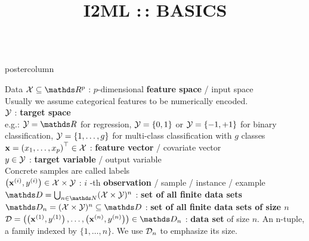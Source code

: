 \documentclass{beamer}
\title{I2ML :\,: BASICS} %
\begin{document}
\begin{frame}[fragile]{}
\vspace{-8ex}
\begin{columns}
	\begin{column}{.31\textwidth}
		\begin{beamercolorbox}[center]{postercolumn}
			\begin{minipage}{.98\textwidth}
				\parbox[t][\columnheight]{\textwidth}{
\begin{myblock}{Data}
 $\Xspace \subseteq \R^p$ : $p$-dimensional \textbf{feature space} / input space\\ 
Usually we assume categorical features to be numerically encoded.\\

$\mathcal{Y}$ : \textbf{target space} \\ 
e.g.: $\Yspace = \R$ for regression, $\mathcal{Y} = \{0, 1\}$ or $\mathcal{Y} = \{-1, +1\}$ for binary classification, $\mathcal{Y} = \{1, \ldots, g\}$ for multi-class classification with $g$ classes\\

$\mathbf{x} = \left(x_1, \ldots, x_p\right)^\top \in \mathcal{X}$ : \textbf{feature vector} / covariate vector\\ 
 
$y \in \mathcal{Y}$ : \textbf{target variable} / output variable \\
Concrete samples are called labels \\

$\left(\mathbf{x}^{(i)}, y^{(i)}\right) \in \mathcal{X}\times \mathcal{Y}$ : $i$ -th \textbf{observation} / sample / instance / example\\

$\allDatasets = \defAllDatasets$ : \textbf{set of all finite data sets} \\

$\allDatasetsn = \defAllDatasetsn \subseteq \allDatasets$ : \textbf{set of all finite data sets of size $n$} \\

$\D = \Dset \in \allDatasetsn $ : \textbf{data set} of size $n$.
An n-tuple, a family indexed by $\{1, \dots, n\}$. 
We use $\mathcal{D}_n$ to emphasize its size.\\
 

\end{myblock}}
\end{minipage}
\end{beamercolorbox}
\end{column}
\end{columns}
\end{frame}
\end{document}
